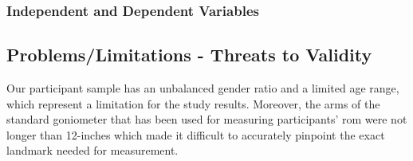 \subsubsection{Independent and Dependent Variables}

\subsection{Problems/Limitations - Threats to Validity}
Our participant sample has an unbalanced gender ratio and a limited age range, which represent a limitation for the study results. Moreover, the arms of the standard goniometer that has been used for measuring participants' \acrshort{rom} were not longer than 12-inches which made it difficult to accurately pinpoint the exact landmark needed for measurement. \pagebreak
